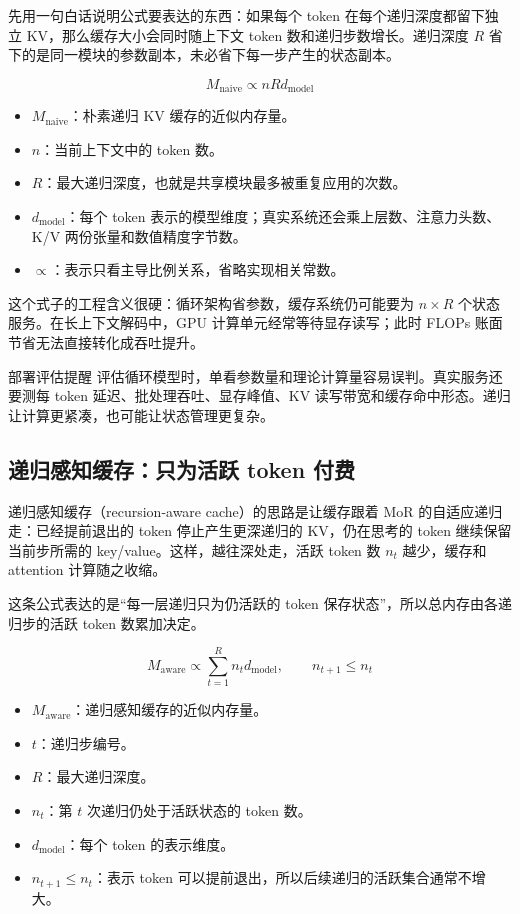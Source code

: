 先用一句白话说明公式要表达的东西：如果每个 token 在每个递归深度都留下独立 KV，那么缓存大小会同时随上下文 token 数和递归步数增长。递归深度 \(R\) 省下的是同一模块的参数副本，未必省下每一步产生的状态副本。

$$
M_{\mathrm{naive}}\propto nR d_{\mathrm{model}}
$$

\begin{itemize}
  \item \(M_{\mathrm{naive}}\)：朴素递归 KV 缓存的近似内存量。
  \item \(n\)：当前上下文中的 token 数。
  \item \(R\)：最大递归深度，也就是共享模块最多被重复应用的次数。
  \item \(d_{\mathrm{model}}\)：每个 token 表示的模型维度；真实系统还会乘上层数、注意力头数、K/V 两份张量和数值精度字节数。
  \item \(\propto\)：表示只看主导比例关系，省略实现相关常数。
\end{itemize}

这个式子的工程含义很硬：循环架构省参数，缓存系统仍可能要为 \(n\times R\) 个状态服务。在长上下文解码中，GPU 计算单元经常等待显存读写；此时 FLOPs 账面节省无法直接转化成吞吐提升。

\begin{warningbox}{部署评估提醒}
评估循环模型时，单看参数量和理论计算量容易误判。真实服务还要测每 token 延迟、批处理吞吐、显存峰值、KV 读写带宽和缓存命中形态。递归让计算更紧凑，也可能让状态管理更复杂。
\end{warningbox}

\subsection{递归感知缓存：只为活跃 token 付费}

递归感知缓存（recursion-aware cache）的思路是让缓存跟着 MoR 的自适应递归走：已经提前退出的 token 停止产生更深递归的 KV，仍在思考的 token 继续保留当前步所需的 key/value。这样，越往深处走，活跃 token 数 \(n_t\) 越少，缓存和 attention 计算随之收缩。

这条公式表达的是“每一层递归只为仍活跃的 token 保存状态”，所以总内存由各递归步的活跃 token 数累加决定。

$$
M_{\mathrm{aware}}\propto \sum_{t=1}^{R} n_t d_{\mathrm{model}},\qquad n_{t+1}\le n_t
$$

\begin{itemize}
  \item \(M_{\mathrm{aware}}\)：递归感知缓存的近似内存量。
  \item \(t\)：递归步编号。
  \item \(R\)：最大递归深度。
  \item \(n_t\)：第 \(t\) 次递归仍处于活跃状态的 token 数。
  \item \(d_{\mathrm{model}}\)：每个 token 的表示维度。
  \item \(n_{t+1}\le n_t\)：表示 token 可以提前退出，所以后续递归的活跃集合通常不增大。
\end{itemize}

